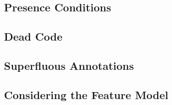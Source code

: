 

\subsection{Presence Conditions}

\subsection{Dead Code} %


\subsection{Superfluous Annotations}


\subsection{Considering the Feature Model}

